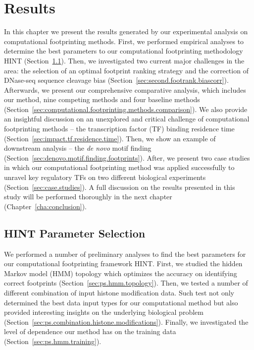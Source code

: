 \chapter{Results}
\label{cha:results}

\graphicspath{{chapter5/figs/}}

In this chapter we present the results generated by our experimental analysis on computational footprinting methods. First, we performed empirical analyses to determine the best parameters to our computational footprinting methodology HINT (Section~\ref{sec:first.hint.parameter.selection}). Then, we investigated two current major challenges in the area: the selection of an optimal footprint ranking strategy and the correction of DNase-seq sequence cleavage bias (Section~\ref{sec:second.footrank.biascorr}). Afterwards, we present our comprehensive comparative analysis, which includes our method, nine competing methods and four baseline methods (Section~\ref{sec:computational.footprinting.methods.comparison}). We also provide an insightful discussion on an unexplored and critical challenge of computational footprinting methods -- the transcription factor (TF) binding residence time (Section~\ref{sec:impact.tf.residence.time}). Then, we show an example of downstream analysis -- the \emph{de novo} motif finding (Section~\ref{sec:denovo.motif.finding.footprints}). After, we present two case studies in which our computational footprinting method was applied successfully to unravel key regulatory TFs on two different biological experiments (Section~\ref{sec:case.studies}). A full discussion on the results presented in this study will be performed thoroughly in the next chapter (Chapter~\ref{cha:conclusion}).

\section{HINT Parameter Selection}
\label{sec:first.hint.parameter.selection}

We performed a number of preliminary analyses to find the best parameters for our computational footprinting framework HINT. First, we studied the hidden Markov model (HMM) topology which optimizes the accuracy on identifying correct footprints (Section~\ref{sec:ps.hmm.topology}). Then, we tested a number of different combination of input histone modification data. Such test not only determined the best data input types for our computational method but also provided interesting insights on the underlying biological problem (Section~\ref{sec:ps.combination.histone.modifications}). Finally, we investigated the level of dependence our method has on the training data (Section~\ref{sec:ps.hmm.training}). 

